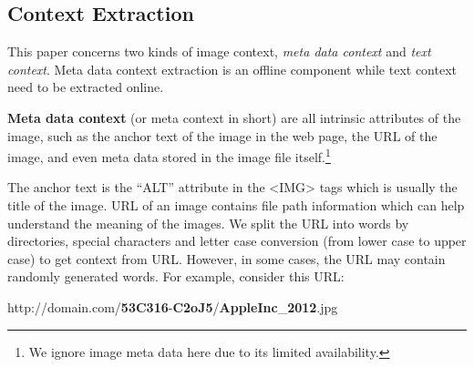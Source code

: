 \subsection{Context Extraction}
\label{sec:context}
This paper concerns two kinds of image context, {\em meta data context}
and {\em text context}. Meta data context extraction is an offline component while
text context need to be extracted online.

\textbf{Meta data context} (or meta context in short)
are all intrinsic attributes of the image, such as the anchor text of
the image in the web page, the URL of the image, and even meta data stored
in the image file itself.\footnote{We ignore image meta data here due to
its limited availability.}

The anchor text is the ``ALT'' attribute in the <IMG> tags which is usually
the title of the image. URL of an image contains file path information which
can help understand the meaning of the images.
We split the URL into words by directories,
special characters and letter case conversion (from lower case to upper case)
to get context from URL.
However, in some cases, the URL may contain randomly generated
words.
For example, consider this URL:

\smallskip

http://domain.com/\textbf{53C316}-\textbf{C2oJ5}/\textbf{AppleInc}\_\textbf{2012}.jpg

\smallskip

